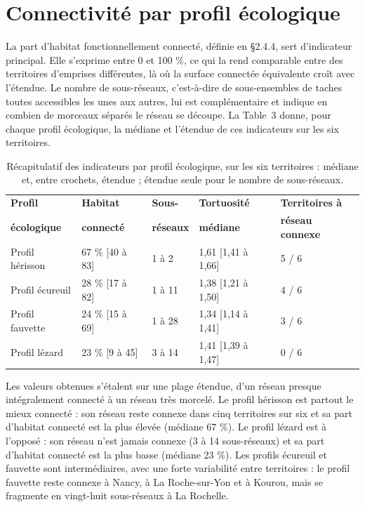 \documentclass[a4paper,12pt]{report}
\begin{document}
\section{Connectivité par profil écologique}
La part d'habitat fonctionnellement connecté, définie en §2.4.4, sert d'indicateur principal. Elle s'exprime entre 0 et 100 \%, ce qui la rend comparable entre des territoires d'emprises différentes, là où la surface connectée équivalente croît avec l'étendue. Le nombre de sous-réseaux, c'est-à-dire de sous-ensembles de taches toutes accessibles les unes aux autres, lui est complémentaire et indique en combien de morceaux séparés le réseau se découpe. La Table~3 donne, pour chaque profil écologique, la médiane et l'étendue de ces indicateurs sur les six territoires.
\begin{table}[H]
\centering
\small
\setlength{\tabcolsep}{5pt}
\caption{Récapitulatif des indicateurs par profil écologique, sur les six territoires : médiane et, entre crochets, étendue ; étendue seule pour le nombre de sous-réseaux.}
\begin{tabular}{@{}lllll@{}}
\toprule
\textbf{Profil} & \textbf{Habitat} & \textbf{Sous-} & \textbf{Tortuosité} & \textbf{Territoires à} \\
\textbf{écologique} & \textbf{connecté} & \textbf{réseaux} & \textbf{médiane} & \textbf{réseau connexe} \\
\midrule
Profil hérisson & 67 \% [40 à 83] & 1 à 2 & 1,61 [1,41 à 1,66] & 5 / 6 \\
Profil écureuil & 28 \% [17 à 82] & 1 à 11 & 1,38 [1,21 à 1,50] & 4 / 6 \\
Profil fauvette & 24 \% [15 à 69] & 1 à 28 & 1,34 [1,14 à 1,41] & 3 / 6 \\
Profil lézard & 23 \% [9 à 45] & 3 à 14 & 1,41 [1,39 à 1,47] & 0 / 6 \\
\bottomrule
\end{tabular}
\end{table}

Les valeurs obtenues s'étalent sur une plage étendue, d'un réseau presque intégralement connecté à un réseau très morcelé. Le profil hérisson est partout le mieux connecté : son réseau reste connexe dans cinq territoires sur six et sa part d'habitat connecté est la plus élevée (médiane 67 \%). Le profil lézard est à l'opposé : son réseau n'est jamais connexe (3 à 14 sous-réseaux) et sa part d'habitat connecté est la plus basse (médiane 23 \%). Les profils écureuil et fauvette sont intermédiaires, avec une forte variabilité entre territoires : le profil fauvette reste connexe à Nancy, à La Roche-sur-Yon et à Kourou, mais se fragmente en vingt-huit sous-réseaux à La Rochelle.
\end{document}
